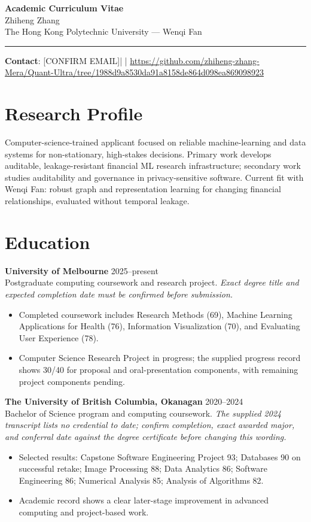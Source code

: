 \documentclass[11pt]{article}
\newcommand{\ApplicantName}{Zhiheng Zhang}
\newcommand{\ApplicantEmail}{[CONFIRM EMAIL]}
\newcommand{\ApplicantPhone}{[CONFIRM PHONE]}
\newcommand{\ApplicantGitHub}{\url{https://github.com/zhiheng-zhang-Mera/Quant-Ultra/tree/1988d9a8530da91a8158de864d098ea869098923}}
\begin{document}
\begin{center}
{\LARGE\bfseries Academic Curriculum Vitae}\\[0.25em]
{\large \ApplicantName}\\
The Hong Kong Polytechnic University --- Wenqi Fan
\end{center}
\vspace{0.35em}\hrule\vspace{0.65em}

\textbf{Contact}: \ApplicantEmail\quad | \quad \ApplicantPhone\quad | \quad \ApplicantGitHub

\section*{Research Profile}
Computer-science-trained applicant focused on reliable machine-learning and data systems for non-stationary, high-stakes decisions. Primary work develops auditable, leakage-resistant financial ML research infrastructure; secondary work studies auditability and governance in privacy-sensitive software. Current fit with Wenqi Fan: robust graph and representation learning for changing financial relationships, evaluated without temporal leakage.

\section*{Education}
\textbf{University of Melbourne} \hfill 2025--present\\
Postgraduate computing coursework and research project. \textit{Exact degree title and expected completion date must be confirmed before submission.}
\begin{itemize}
\item Completed coursework includes Research Methods (69), Machine Learning Applications for Health (76), Information Visualization (70), and Evaluating User Experience (78).
\item Computer Science Research Project in progress; the supplied progress record shows 30/40 for proposal and oral-presentation components, with remaining project components pending.
\end{itemize}

\textbf{The University of British Columbia, Okanagan} \hfill 2020--2024\\
Bachelor of Science program and computing coursework. \textit{The supplied 2024 transcript lists no credential to date; confirm completion, exact awarded major, and conferral date against the degree certificate before changing this wording.}
\begin{itemize}
\item Selected results: Capstone Software Engineering Project 93; Databases 90 on successful retake; Image Processing 88; Data Analytics 86; Software Engineering 86; Numerical Analysis 85; Analysis of Algorithms 82.
\item Academic record shows a clear later-stage improvement in advanced computing and project-based work.
\end{itemize}
\end{document}

